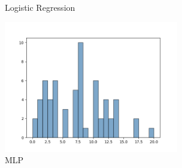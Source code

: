 \documentclass[UTF8,a4paper,10pt]{ctexart}
\begin{document}
\begin{itemize}
\begin{figure}[H]
\begin{minipage}[t]{0.5\linewidth}
    \caption{Logistic Regression}
    \label{fig:side:a}
    \end{minipage}%
    \begin{minipage}[t]{0.5\linewidth}
    \centering
    \includegraphics[width=3in]{output_mlp_hist.png}
    \caption{MLP}
    \label{fig:side:b}
    \end{minipage}
    \end{figure}


\end{itemize}
\end{document}
